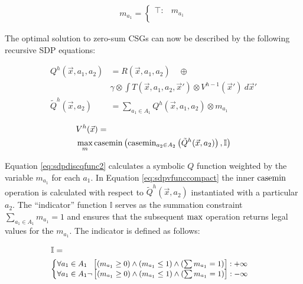 {\small 
\abovedisplayskip=0pt
\belowdisplayskip=0pt
\begin{align*}
  m_{a_{1}} = 
    \begin{cases}
      \top: & m_{a_{1}} \\ 
    \end{cases}
\end{align*}
}%

The optimal solution to zero-sum CSGs can now be described by the following
recursive SDP equations:

{\small 
\abovedisplayskip=0pt
\belowdisplayskip=0pt
\begin{align}
  Q^{h}(\vec{x}, a_1, a_2) &= R(\vec{x}, a_1, a_2) \quad \oplus \nonumber \\
  & \gamma \otimes \int T(\vec{x}, a_1, a_2, \vec{x}') \otimes V^{h-1}(\vec{x}')\ d\vec{x}' \label{eq:sdpdiscqfunc} \\
  \tilde{Q}^{h}(\vec{x}, a_2) &= \sum_{a_1 \in A_1} Q^{h}(\vec{x}, a_1, a_2) \otimes m_{a_{1}} \label{eq:sdpdiscqfunc2}
\end{align}
}%

{\small 
\abovedisplayskip=0pt
\belowdisplayskip=0pt
\begin{align}
\label{eq:sdpvfunccompact}
& V^{h}(\vec{x}) = \nonumber \\
& \max_{m} \mathrm{casemin} \left( \mathrm{casemin}_{a_2 \in A_2} \left( \tilde{Q}^{h}(\vec{x}, a_2) \right), \mathbb{I} \right)
\end{align}
}%

Equation \eqref{eq:sdpdiscqfunc2} calculates a symbolic $Q$ function weighted 
by the variable $m_{a_{1}}$ for each $a_1$. In Equation \eqref{eq:sdpvfunccompact} the inner $\mathrm{casemin}$ operation 
is calculated with respect to {\small $\tilde{Q}^{h}(\vec{x}, a_2)$} instantiated 
with a particular $a_2$. The ``indicator'' function  $\mathbb{I}$ serves as the summation constraint 
{\small $\sum_{a_{1} \in A_1} m_{a_{1}} = 1$} and ensures that the subsequent $\mathrm{max}$ operation returns 
legal values for the $m_{a_{1}}$. The indicator is defined as follows:

{\small
\abovedisplayskip=0pt
\belowdisplayskip=0pt
\begin{align*}
  & \mathbb{I} = \\
  & {\footnotesize
    \begin{cases}
      \forall a_{1} \in A_1 \hspace{6pt}\left[(m_{a_{1}} \geq 0) \wedge (m_{a_{1}} \leq 1 ) \wedge (\sum m_{a_{1}} = 1) \right]: +\infty \\ 
      \forall a_{1} \in A_1 \neg \left[(m_{a_{1}} \geq 0) \wedge (m_{a_{1}} \leq 1 ) \wedge (\sum m_{a_{1}} = 1) \right]: -\infty \\ 
    \end{cases} 
   }
\end{align*}
}%

